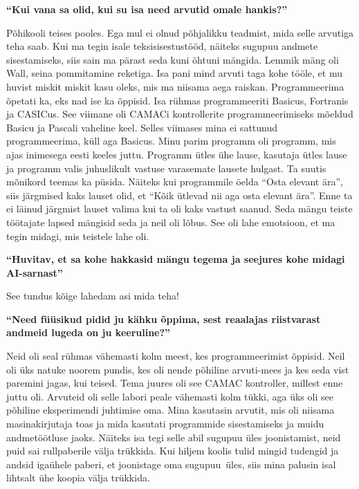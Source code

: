 \textbf{\enquote{Kui vana sa olid, kui su isa need arvutid omale hankis?}}

Põhikooli teises pooles. Ega mul ei olnud põhjalikku teadmist, mida selle arvutiga teha saab. Kui ma tegin isale teksisisestustööd, näiteks sugupuu andmete sisestamiseks, siis sain ma pärast seda kuni õhtuni mängida. Lemmik mäng oli Wall, seina pommitamine reketiga. Isa pani mind arvuti taga kohe tööle, et mu huvist miskit miskit kasu oleks, mis ma niisama aega raiskan. Programmeerima õpetati ka, eks nad ise ka õppisid. Isa rühmas programmeeriti Basicus, Fortranis ja CASICus. See viimane oli CAMACi kontrollerite programmeerimiseks mõeldud Basicu ja Pascali vaheline keel. Selles viimases mina ei sattunud programmeerima, küll aga Basicus. Minu parim programm oli programm, mis ajas inimesega eesti keeles juttu. Programm ütles ühe lause, kasutaja ütles lause ja programm valis juhuslikult vastuse varasemate lausete hulgast. Ta suutis mõnikord teemas ka püsida. Näiteks kui programmile öelda \enquote{Osta elevant ära}, siis järgmised kaks lauset olid, et \enquote{Kõik ütlevad nii aga osta elevant ära}. Enne ta ei läinud järgmist lauset valima kui ta oli kaks vastust saanud. Seda mängu teiste töötajate lapsed mängisid seda ja neil oli lõbus. See oli lahe emotsioon, et ma tegin midagi, mis teistele lahe oli. 

\textbf{\enquote{Huvitav, et sa kohe hakkasid mängu tegema ja seejures kohe midagi AI-sarnast}}

See tundus kõige lahedam asi mida teha! 

\textbf{\enquote{Need füüsikud pidid ju kähku õppima, sest reaalajas riistvarast andmeid lugeda on ju keeruline?}}

Neid oli seal rühmas vähemasti kolm meest, kes programmeerimist õppisid. Neil oli üks natuke noorem pundis, kes oli nende põhiline arvuti-mees ja kes seda vist paremini jagas, kui teised. Tema juures oli see CAMAC kontroller, millest enne juttu oli. Arvuteid oli selle labori peale vähemasti kolm tükki,  aga üks oli see põhiline eksperimendi juhtimise oma. Mina kasutasin arvutit, mis oli niisama masinakirjutaja toas ja mida kasutati programmide sisestamiseks ja muidu andmetöötluse jaoks. Näiteks isa tegi selle abil sugupuu üles joonistamist, neid puid sai rullpaberile välja trükkida. Kui hiljem koolis tulid mingid tudengid ja andsid igaühele paberi, et joonistage oma sugupuu üles, siis mina palusin isal lihtsalt ühe koopia välja trükkida. 

